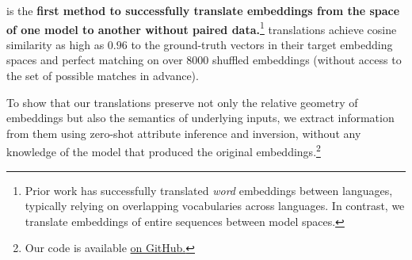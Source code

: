 \atk{} is the
\textbf{first method to successfully translate embeddings from the space of one model to another without paired data.}\footnote{Prior work has successfully translated \emph{word} embeddings between languages, typically relying on overlapping vocabularies across languages. In contrast, we translate embeddings of entire sequences between model spaces.}
\atk{}
translations achieve cosine similarity as high as $0.96$ to the ground-truth vectors in their target embedding spaces and perfect matching on over $8000$ shuffled embeddings (without access to the set of possible matches in advance). 

To show that our translations preserve not only the relative geometry of embeddings but also the semantics of underlying inputs, we extract information from them using zero-shot attribute inference and inversion, without any knowledge of the model that produced the original embeddings.\footnote{Our code is available \href{https://github.com/rjha18/vec2vec/}{on GitHub.}}



